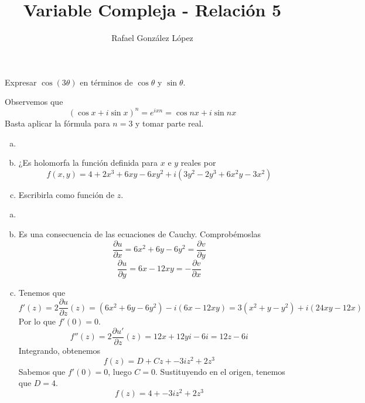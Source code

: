 \documentclass[twoside]{article}
\begin{document}
\title{Variable Compleja - Relación 5}
\author{Rafael González López}
\maketitle


\begin{ejercicio}{1}
Expresar $\cos(3\theta)$ en términos de $\cos\theta$ y $\sin\theta$.
\end{ejercicio}
\begin{solucion}
Observemos que
$$
(\cos x + i \sin x)^n = e^{ixn} = \cos nx + i\sin nx
$$
Basta aplicar la fórmula para $n=3$ y tomar parte real.

\end{solucion}

\newpage

\begin{ejercicio}{2}
\begin{enumerate}[(a)]
\item[]
\item ¿Es holomorfa la función definida para $x$ e $y$ reales por 
\[f(x,y)=4+2x^3+6x y-6x y^2+ i(3y^2-2y^3+6x^2y-3x^2)\]
\item Escribirla como función de $z$. 
\end{enumerate}
\end{ejercicio}
\begin{solucion}
\begin{enumerate}[(a)]
\item[]
\item Es una consecuencia de las ecuaciones de Cauchy. Comprobémoslas
$$
\frac{\partial u}{\partial x} = 6x^2+6y -6y^2 = \frac{\partial v}{\partial y} 
$$
$$
\frac{\partial u}{\partial y} = 6x-12xy = -\frac{\partial v}{\partial x} 
$$
\item Tenemos que
$$
f'(z) = 2\frac{\partial u }{\partial z}(z) = (6x^2+6y -6y^2) -i(6x-12xy) = 3(x^2+y-y^2) + i(24xy-12x)
$$
Por lo que $f'(0)=0$.
$$
f''(z)=2\frac{\partial u' }{\partial z}(z) = 12x +12yi -6i = 12z-6i
$$
Integrando, obtenemos
$$
f(z) = D + Cz + -3iz^2+2z^3
$$
Sabemos que $f'(0)=0$, luego $C=0$. Sustituyendo en el origen, tenemos que $D=4$.
$$
f(z) = 4+ -3iz^2+2z^3
$$
\end{enumerate}
\end{solucion}

\newpage
\end{document}
